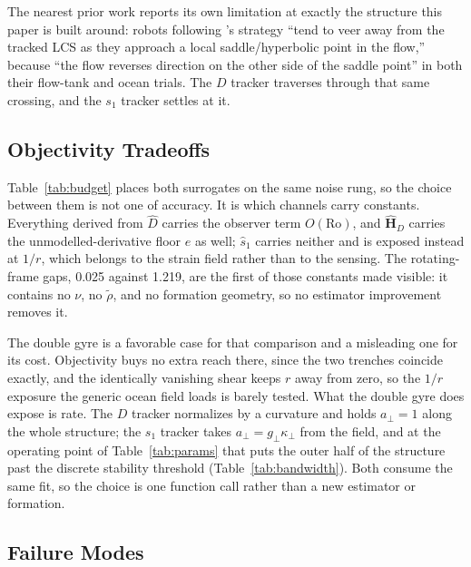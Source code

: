 \documentclass[lettersize,journal]{IEEEtran}
\begin{document}
The nearest prior work reports its own limitation at exactly the
structure this paper is built around: robots following \cite{9}'s
strategy ``tend to veer away from the tracked LCS as they approach a
local saddle/hyperbolic point in the flow,'' because ``the flow
reverses direction on the other side of the saddle point'' in both
their flow-tank and ocean trials. The $D$ tracker traverses through
that same crossing, and the $s_1$ tracker settles at it.


\subsection{Objectivity Tradeoffs}
\label{sec:objectivity_tradeoff}

Table~\ref{tab:budget} places both surrogates on the same noise rung, so
the choice between them is not one of accuracy. It is which channels
carry constants. Everything derived from $\hat{D}$ carries the observer
term $O(\mathrm{Ro})$, and $\hat{\mathbf{H}}_D$ carries the
unmodelled-derivative floor $e$ as well; $\hat{s}_1$ carries neither and
is exposed instead at $1/r$, which belongs to the strain field rather
than to the sensing. The rotating-frame gaps, 0.025 against 1.219, are
the first of those constants made visible: it contains no $\nu$, no
$\tilde{\rho}$, and no formation geometry, so no estimator improvement
removes it.

The double gyre is a favorable case for that comparison and a
misleading one for its cost. Objectivity buys no extra reach there,
since the two trenches coincide exactly, and the identically vanishing
shear keeps $r$ away from zero, so the $1/r$ exposure the generic ocean
field loads is barely tested. What the double gyre does expose is
rate. The $D$ tracker
normalizes by a curvature and holds $a_\perp = 1$ along the whole
structure; the $s_1$ tracker takes $a_\perp = g_\perp\kappa_\perp$ from
the field, and at the operating point of Table~\ref{tab:params} that
puts the outer half of the structure past the discrete stability
threshold (Table~\ref{tab:bandwidth}). Both consume the same fit, so the
choice is one function call rather than a new estimator or formation.

\subsection{Failure Modes}
\label{sec:failure_modes}
\end{document}
